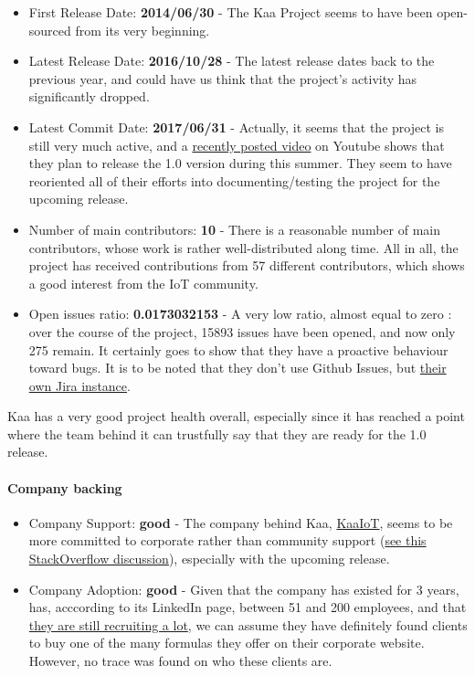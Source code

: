 \documentclass{article}
\begin{document}
\begin{itemize}
\item First Release Date: \textbf{2014/06/30} - The Kaa Project seems to have been open-sourced from its very beginning.
\item Latest Release Date: \textbf{2016/10/28} - The latest release dates back to the previous year, and could have us think that the project's activity has significantly dropped.
\item Latest Commit Date: \textbf{2017/06/31} - Actually, it seems that the project is still very much active, and a \href{https://www.youtube.com/watch?v=PaRSwYIGMG4}{recently posted video} on Youtube shows that they plan to release the 1.0 version during this summer. They seem to have reoriented all of their efforts into documenting/testing the project for the upcoming release.
\item Number of main contributors: \textbf{10} - There is a reasonable number of main contributors, whose work is rather well-distributed along time. All in all, the project has received contributions from 57 different contributors, which shows a good interest from the IoT community.
\item Open issues ratio: \textbf{0.0173032153} - A very low ratio, almost equal to zero : over the course of the project, 15893 issues have been opened, and now only 275 remain. It certainly goes to show that they have a proactive behaviour toward bugs. It is to be noted that they don't use Github Issues, but \href{http://jira.kaaproject.org/projects/KAA/issues/}{their own Jira instance}.
\end{itemize}

Kaa has a very good project health overall, especially since it has reached a point where the team behind it can trustfully say that they are ready for the 1.0 release.

\paragraph{Company backing}

\begin{itemize}
\item Company Support: \textbf{good} - The company behind Kaa, \href{https://www.kaaiot.io/}{KaaIoT}, seems to be more committed to corporate rather than community support (\href{https://stackoverflow.com/questions/44330714/why-are-the-questions-about-kaa-basically-not-being-answered}{see this StackOverflow discussion}), especially with the upcoming release.
\item Company Adoption: \textbf{good} - Given that the company has existed for 3 years, has, acccording to its LinkedIn page, between 51 and 200 employees, and that \href{https://www.kaaiot.io/company/careers/}{they are still recruiting a lot}, we can assume they have definitely found clients to buy one of the many formulas they offer on their corporate website. However, no trace was found on who these clients are.
\end{itemize}
\end{document}

